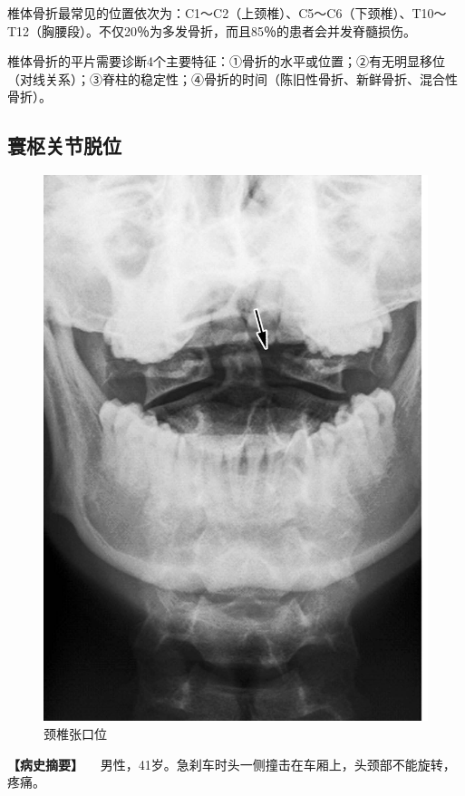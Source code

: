椎体骨折最常见的位置依次为：C1～C2（上颈椎）、C5～C6（下颈椎）、T10～T12（胸腰段）。不仅20％为多发骨折，而且85％的患者会并发脊髓损伤。

椎体骨折的平片需要诊断4个主要特征：①骨折的水平或位置；②有无明显移位（对线关系）；③脊柱的稳定性；④骨折的时间（陈旧性骨折、新鲜骨折、混合性骨折）。

\subsection{寰枢关节脱位}

\begin{figure}[!htbp]
 \centering
 \includegraphics{./images/Image00060.jpg}
 \captionsetup{justification=centering}
 \caption{颈椎张口位}
 \label{fig2-3-33}
  \end{figure} 

\textbf{【病史摘要】}
　男性，41岁。急刹车时头一侧撞击在车厢上，头颈部不能旋转，疼痛。

